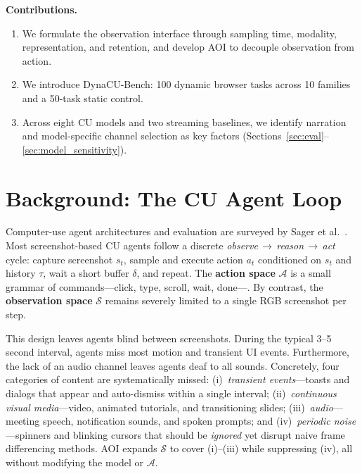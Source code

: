 \documentclass[letterpaper]{article} %
\begin{document}
\textbf{Contributions.}
\begin{enumerate}
  \item We formulate the observation interface through sampling time, modality,
  representation, and retention, and develop AOI to decouple observation from
  action.
  \item We introduce DynaCU-Bench: 100 dynamic browser tasks across 10 families
  and a 50-task static control.
  \item Across eight CU models and two streaming baselines, we identify
  narration and model-specific channel selection as key factors
  (Sections~\ref{sec:eval}--\ref{sec:model_sensitivity}).
\end{enumerate}

\section{Background: The CU Agent Loop}
\label{sec:background}

Computer-use agent architectures and evaluation are surveyed by Sager et al.~\citep{cusurvey}.
Most screenshot-based CU agents follow a discrete \emph{observe\,$\to$\,reason\,$\to$\,act}
cycle: capture screenshot $s_t$, sample and execute action $a_t$ conditioned on $s_t$ and history $\tau$, wait a short buffer $\delta$, and repeat.
The \textbf{action space} $\mathcal{A}$ is a small grammar of commands---click, type, scroll, wait, done---\citep{sweagent}.
By contrast, the \textbf{observation space} $\mathcal{S}$ remains severely limited to a single RGB screenshot per step.

This design leaves agents blind between screenshots. During the typical 3--5 second interval, agents miss most motion and transient UI events. Furthermore, the lack of an audio channel leaves agents deaf to all sounds.
Concretely, four categories of content are systematically missed:
(i)~\emph{transient events}---toasts and dialogs that appear and auto-dismiss
within a single interval;
(ii)~\emph{continuous visual media}---video, animated tutorials, and transitioning
slides;
(iii)~\emph{audio}---meeting speech, notification sounds, and spoken prompts; and
(iv)~\emph{periodic noise}---spinners and blinking cursors that should be
\emph{ignored} yet disrupt naive frame differencing methods.
AOI expands $\mathcal{S}$ to cover (i)--(iii) while suppressing (iv), all without
modifying the model or $\mathcal{A}$.
\end{document}
